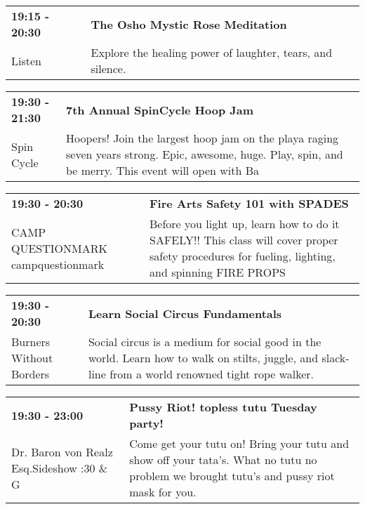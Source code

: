 \begin{tabular}{ p{1in} p{2.2in} }
    \textbf{19:15 - 20:30} & \textbf{The Osho Mystic Rose Meditation} \\
    Listen \newline  & Explore the healing power of laughter, tears, and silence. \\
    \hline 
\end{tabular}
    
\begin{tabular}{ p{1in} p{2.2in} }
    \textbf{19:30 - 21:30} & \textbf{7th Annual SpinCycle Hoop Jam} \\
    Spin Cycle \newline  & Hoopers! Join the largest hoop jam on the playa raging seven years strong. Epic, awesome, huge. Play, spin, and be merry. This event will open with Ba \\
    \hline 
\end{tabular}
    
\begin{tabular}{ p{1in} p{2.2in} }
    \textbf{19:30 - 20:30} & \textbf{Fire Arts Safety 101 with SPADES} \\
    CAMP QUESTIONMARK \newline campquestionmark & Before you light up, learn how to do it SAFELY!! This class will cover proper safety procedures for fueling, lighting, and spinning FIRE PROPS \\
    \hline 
\end{tabular}
    
\begin{tabular}{ p{1in} p{2.2in} }
    \textbf{19:30 - 20:30} & \textbf{Learn Social Circus Fundamentals} \\
    Burners Without Borders \newline  & Social circus is a medium for social good in the world. Learn how to walk on stilts, juggle, and  slack-line from a world renowned tight rope walker. \\
    \hline 
\end{tabular}
    
\begin{tabular}{ p{1in} p{2.2in} }
    \textbf{19:30 - 23:00} & \textbf{Pussy Riot! topless tutu Tuesday party!} \\
    Dr. Baron von Realz Esq.Sideshow \newline 4:30 \& G & Come get your tutu on! Bring your tutu and show off your tata's. What no tutu no problem we brought tutu's and pussy riot mask for you. \\
    \hline 
\end{tabular}
    
